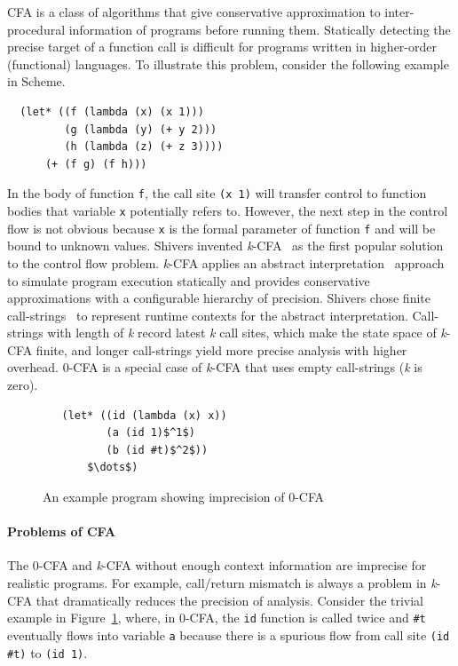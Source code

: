 \documentclass[12pt]{report}
\begin{document}
CFA is a class of algorithms that give conservative approximation to inter-procedural information of programs
before running them.
Statically detecting the precise target of a function call is difficult for programs written in
higher-order (functional) languages.
To illustrate this problem, consider the following example in Scheme.
\begin{lstlisting}
  (let* ((f (lambda (x) (x 1)))
         (g (lambda (y) (+ y 2)))
         (h (lambda (z) (+ z 3))))
      (+ (f g) (f h)))
\end{lstlisting}
In the body of function \verb|f|, the call site \verb|(x 1)| will transfer control to function bodies that variable \verb|x| potentially refers to.
However, the next step in the control flow is not obvious because \verb|x| is the formal parameter of function \verb|f| and will be bound to
unknown values.
Shivers invented \textit{k}-CFA~\cite{shivers1991control}
as the first popular solution to the control flow problem.
\textit{k}-CFA applies an abstract interpretation~\cite{cousot1977abstract} approach to simulate program execution statically and
provides conservative approximations with a configurable hierarchy of precision.
Shivers chose finite call-strings~\cite{sharir1978two} to represent runtime contexts for the abstract interpretation.
Call-strings with length of \textit{k} record latest \textit{k} call sites, which make the state space of \textit{k}-CFA finite, and longer call-strings yield more precise analysis with higher overhead.
0-CFA is a special case of \textit{k}-CFA that uses empty call-strings (\textit{k} is zero).
 \begin{figure}
 \begin{lstlisting}
   (let* ((id (lambda (x) x))
          (a (id 1)$^1$)
          (b (id #t)$^2$))
       $\dots$)
 \end{lstlisting}
 \caption{An example program showing imprecision of 0-CFA}
 \label{fig:eg1}
 \end{figure}
\paragraph{Problems of CFA}
The 0-CFA and \textit{k}-CFA without enough context information are imprecise for realistic programs.
For example, call/return mismatch is always a problem in \textit{k}-CFA that dramatically reduces the precision of analysis.
Consider the trivial example in Figure~\ref{fig:eg1}, where, in 0-CFA, the \verb|id| function is called twice and \verb|#t| eventually flows into variable \verb|a| because there is a spurious flow from call site
\verb|(id #t)| to \verb|(id 1)|.
\end{document}
